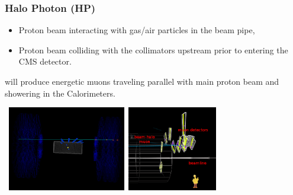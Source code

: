 \documentclass{beamer}
\begin{document}
\begin{frame}
\frametitle{Halo Photon (HP)}
 \begin{tcolorbox}[colback=UNL@Cream!5,colframe=UMN@Maroon!40,title=\textcolor{UMN@Gold}{\textbf{Beam Halo Muons}}]
\begin{itemize}
 \item Proton beam interacting with gas/air particles in the beam pipe,
 \item Proton beam colliding with the collimators upstream prior to entering the CMS detector.
\end{itemize}
will produce energetic muons traveling parallel with main proton beam and showering in the Calorimeters.
\end{tcolorbox}
 \begin{minipage}[t]{0.8\linewidth}
  \mbox{
   \includegraphics[height=3.7cm,width=0.40\paperwidth]{THESISPLOTS/Beam_Halo-CandidateEvent24186728-Run122314.png}\quad
   \includegraphics[height=3.7cm,width=0.40\paperwidth]{THESISPLOTS/beam_halo_csc.png}
  }   
 \end{minipage}
\end{frame}
\end{document}
